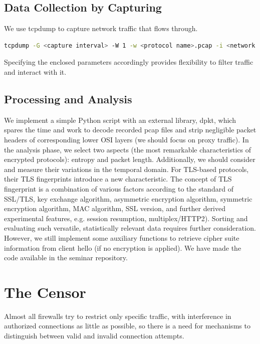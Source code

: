 \documentclass[conference]{IEEEtran}
\begin{document}
\subsection{Data Collection by Capturing}
We use tcpdump \cite{tcpdump} to capture network traffic that flows through. 

\begin{lstlisting}[language=bash]
    tcpdump -G <capture interval> -W 1 -w <protocol name>.pcap -i <network interface> -n dst host <ip> and dst port <port> and <transmission protocol> --print
\end{lstlisting}

Specifying the enclosed parameters accordingly provides flexibility to filter traffic and interact with it.

\subsection{Processing and Analysis}
We implement a simple Python script with an external library, dpkt\cite{dpkt}, which spares the time and work to decode recorded pcap files and strip negligible packet headers of corresponding lower OSI layers (we should focus on proxy traffic). 
In the analysis phase, we select two aspects (the most remarkable characteristics of encrypted protocols): entropy and packet length. Additionally, we should consider and measure their variations in the temporal domain. 
For TLS-based protocols, their TLS fingerprints introduce a new characteristic. The concept of TLS fingerprint is a combination of various factors according to the standard of SSL/TLS, key exchange algorithm, asymmetric encryption algorithm, symmetric encryption algorithm, MAC algorithm, SSL version, and further derived experimental features, e.g. session resumption, multiplex/HTTP2). 
Sorting and evaluating such versatile, statistically relevant data requires further consideration. However, we still implement some auxiliary functions to retrieve cipher suite information from client hello (if no encryption is applied). 
We have made the code available in the seminar repository.

\section{The Censor}
Almost all firewalls try to restrict only specific traffic, with interference in authorized connections as little as possible, so there is a need for mechanisms to distinguish between valid and invalid connection attempts. 
\end{document}
